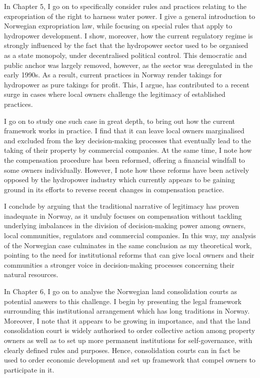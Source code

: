 \documentclass{book} %
\begin{document}
In Chapter 5, I go on to specifically consider rules and practices relating to the expropriation of the right to harness water power. I give a general introduction to Norwegian expropriation law, while focusing on special rules that apply to hydropower development. I show, moreover, how the current regulatory regime is strongly influenced by the fact that the hydropower sector used to be organised as a state monopoly, under decentralised political control. This democratic and public anchor was largely removed, however, as the sector was deregulated in the early 1990s. As a result, current practices in Norway render takings for hydropower as pure takings for profit. This, I argue, has contributed to a recent surge in cases where local owners challenge the legitimacy of established practices.

I go on to study one such case in great depth, to bring out how the current framework works in practice. I find that it can leave local owners marginalised and excluded from the key decision-making processes that eventually lead to the taking of their property by commercial companies. At the same time, I note how the compensation procedure has been reformed, offering a financial windfall to some owners individually. However, I note how these reforms have been actively opposed by the hydropower industry which currently appears to be gaining ground in its efforts to reverse recent changes in compensation practice. 

I conclude by arguing that the traditional narrative of legitimacy has proven inadequate in Norway, as it unduly focuses on compensation without tackling underlying imbalances in the division of decision-making power among owners, local communities, regulators and commercial companies. In this way, my analysis of the Norwegian case culminates in the same conclusion as my theoretical work, pointing to the need for institutional reforms that can give local owners and their communities a stronger voice in decision-making processes concerning their natural resources.

In Chapter 6, I go on to analyse the Norwegian land consolidation courts as potential answers to this challenge. I begin by presenting the legal framework surrounding this institutional arrangement which has long traditions in Norway. Moreover, I note that it appears to be growing in importance, and that the land consolidation court is widely authorised to order collective action among property owners as well as to set up more permanent institutions for self-governance, with clearly defined rules and purposes. Hence, consolidation courts can in fact be used to order economic development and set up framework that compel owners to participate in it. 
\end{document}
